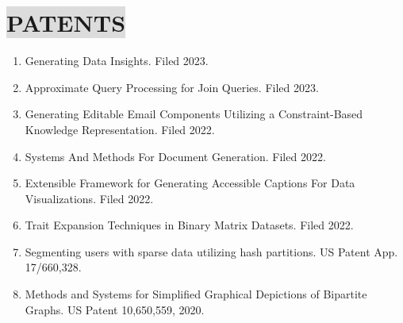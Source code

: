 \section*{
    \colorbox{gainsboro}{PATENTS}  
}

\begin{enumerate}[leftmargin=5mm]
    \item Generating Data Insights. Filed 2023.
    \item Approximate Query Processing for Join Queries. Filed 2023.
    \item Generating Editable Email Components Utilizing a Constraint-Based Knowledge Representation. Filed 2022.
    \item Systems And Methods For Document Generation. Filed 2022.
    \item Extensible Framework for Generating Accessible Captions For Data Visualizations. Filed 2022.
    \item Trait Expansion Techniques in Binary Matrix Datasets. Filed 2022.
	\item Segmenting users with sparse data utilizing hash partitions. US Patent App. 17/660,328.
    \item Methods and Systems for Simplified Graphical Depictions of Bipartite Graphs. US Patent 10,650,559, 2020.
\end{enumerate}